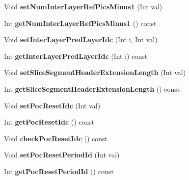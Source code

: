 \begin{DoxyCompactItemize}
Void {\bfseries set\+Num\+Inter\+Layer\+Ref\+Pics\+Minus1} (Int val)
\item 
\mbox{\label{class_t_com_slice_a371bd873b46d1b193ceb9e6ebf28485d}} 
Int {\bfseries get\+Num\+Inter\+Layer\+Ref\+Pics\+Minus1} () const
\item 
\mbox{\label{class_t_com_slice_a6bc6e59066fddf5d23dc3f5c0696922a}} 
Void {\bfseries set\+Inter\+Layer\+Pred\+Layer\+Idc} (Int i, Int val)
\item 
\mbox{\label{class_t_com_slice_ac5bf81aef20559d624c0a4fe10919f40}} 
Int {\bfseries get\+Inter\+Layer\+Pred\+Layer\+Idc} (Int i) const
\item 
\mbox{\label{class_t_com_slice_a2fa3bd7be89be627a426da15114416a8}} 
Void {\bfseries set\+Slice\+Segment\+Header\+Extension\+Length} (Int val)
\item 
\mbox{\label{class_t_com_slice_a289e417775817254ca5adbe189a97d10}} 
Int {\bfseries get\+Slice\+Segment\+Header\+Extension\+Length} () const
\item 
\mbox{\label{class_t_com_slice_a5e4d67d15063a1e70734904e38a3dc45}} 
Void {\bfseries set\+Poc\+Reset\+Idc} (Int val)
\item 
\mbox{\label{class_t_com_slice_afd348b1d11e8037161d9b3da00722e6b}} 
Int {\bfseries get\+Poc\+Reset\+Idc} () const
\item 
\mbox{\label{class_t_com_slice_ab2966cfec45e0d56a4f7ced6bf6c3618}} 
Void {\bfseries check\+Poc\+Reset\+Idc} () const
\item 
\mbox{\label{class_t_com_slice_a7d21f34edbfbe058f471772610b057d1}} 
Void {\bfseries set\+Poc\+Reset\+Period\+Id} (Int val)
\item 
\mbox{\label{class_t_com_slice_a8ee22a2943d871e7655f10c8b92ba5e1}} 
Int {\bfseries get\+Poc\+Reset\+Period\+Id} () const
\item 
\mbox{\label{class_t_com_slice_a06c8cb733b48e5d7a12f87a0d4c32e89}} 

\end{DoxyCompactItemize}
